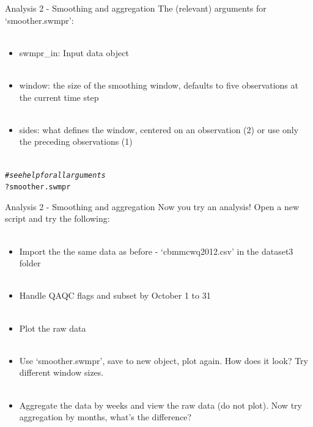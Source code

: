 \documentclass[xcolor=svgnames]{beamer}\usepackage[]{graphicx}\usepackage[]{color}
\makeatletter
\newcommand{\hlcom}[1]{\textcolor[rgb]{0.678,0.584,0.686}{\textit{#1}}}%
\newcommand{\hlopt}[1]{\textcolor[rgb]{0,0,0}{#1}}%
\newcommand{\hlstd}[1]{\textcolor[rgb]{0.345,0.345,0.345}{#1}}%
\newenvironment{kframe}{%
 \def\at@end@of@kframe{}%
 \ifinner\ifhmode%
  \def\at@end@of@kframe{\end{minipage}}%
  \begin{minipage}{\columnwidth}%
 \fi\fi%
 \def\FrameCommand##1{\hskip\@totalleftmargin \hskip-\fboxsep
 \colorbox{shadecolor}{##1}\hskip-\fboxsep
     \hskip-\linewidth \hskip-\@totalleftmargin \hskip\columnwidth}%
 \MakeFramed {\advance\hsize-\width
   \@totalleftmargin\z@ \linewidth\hsize
   \@setminipage}}%
 {\par\unskip\endMakeFramed%
 \at@end@of@kframe}
\newenvironment{knitrout}{}{} %
\makeatother
\begin{document}
\begin{frame}[containsverbatim]{Analysis 2 - Smoothing and aggregation}
The (relevant) arguments for `smoother.swmpr':\\~\\
\begin{itemize}
\item swmpr\_in: Input data object \\~\\
\item window: the size of the smoothing window, defaults to five observations at the current time step \\~\\
\item sides: what defines the window, centered on an observation (2) or use only the preceding observations (1)  \\~\\
\end{itemize}
\begin{knitrout}\scriptsize
{}\color{fgcolor}\begin{kframe}
\begin{alltt}
\hlcom{# see help for all arguments}
\hlopt{?}\hlstd{smoother.swmpr}
\end{alltt}
\end{kframe}
\end{knitrout}
\end{frame}

\begin{frame}[containsverbatim]{Analysis 2 - Smoothing and aggregation}
Now you try an analysis! Open a new script and try the following: \\~\\
\begin{itemize}
\item Import the the same data as before - `cbmmcwq2012.csv' in the dataset3 folder \\~\\
\item Handle QAQC flags and subset by October 1 to 31 \\~\\
\item Plot the raw data \\~\\
\item Use `smoother.swmpr', save to new object, plot again. How does it look? Try different window sizes.\\~\\
\item Aggregate the data by weeks and view the raw data (do not plot).  Now try aggregation by months, what's the difference?\\~\\
\end{itemize}
\end{frame}
\end{document}
